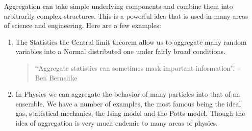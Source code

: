 \documentclass[
  letterpaper,
  DIV=11,
  numbers=noendperiod,
  oneside]{scrartcl}
\begin{document}
\begin{tcolorbox}[enhanced jigsaw, arc=.35mm, bottomrule=.15mm, bottomtitle=1mm, breakable, colback=white, colbacktitle=quarto-callout-tip-color!10!white, colframe=quarto-callout-tip-color-frame, coltitle=black, left=2mm, leftrule=.75mm, opacityback=0, opacitybacktitle=0.6, rightrule=.15mm, title=\textcolor{quarto-callout-tip-color}{\faLightbulb}\hspace{0.5em}{Aggregation your'e No good for me}, titlerule=0mm, toprule=.15mm, toptitle=1mm]

Aggregation can take simple underlying components and combine them into
arbitrarily complex structures. This is a powerful idea that is used in
many areas of science and engineering. Here are a few examples:

\begin{enumerate}
\def\labelenumi{\arabic{enumi}.}
\item
  The Statistics the Central limit theorem allow us to aggregate many
  random variables into a Normal distributed one under fairly broad
  conditions.

  \begin{quote}
  ``Aggregate statistics can sometimes mask important information''. --
  Ben Bernanke
  \end{quote}
\item
  In Physics we can aggregate the behavior of many particles into that
  of an ensemble. We have a number of examples, the most famous being
  the ideal gas, statistical mechanics, the Ising model and the Potts
  model. Though the idea of aggregation is very much endemic to many
  areas of physics.


\end{enumerate}
\end{tcolorbox}
\end{document}
